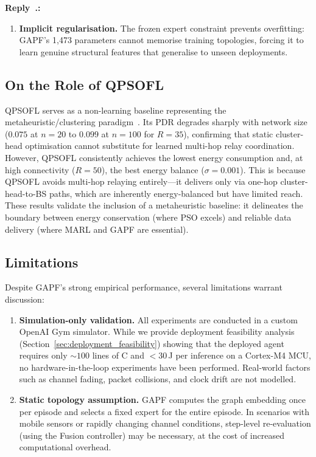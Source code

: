\documentclass[11pt]{article}
\newcounter{reviewer}
\newcounter{replyctr}[reviewer]
\renewcommand{\thereplyctr}{\thereviewer.\arabic{replyctr}}
\newenvironment{reply}
  {\refstepcounter{replyctr}%
   \addtocounter{replyctr}{-1}%
   \medskip\noindent
   \begin{sf}\textbf{Reply~\thereplyctr:}\ }
  {\addtocounter{replyctr}{1}%
   \medskip\end{sf}}
\begin{document}
\begin{refsection}
\begin{mdframed}[style=Resp]
\begin{reply}
\begin{enumerate}
    \item \textbf{Implicit regularisation.} The frozen expert constraint prevents overfitting: GAPF's 1{,}473 parameters cannot memorise training topologies, forcing it to learn genuine structural features that generalise to unseen deployments.
\end{enumerate}

\subsection{On the Role of QPSOFL}

QPSOFL serves as a non-learning baseline representing the metaheuristic/clustering paradigm~\cite{hu_energy_2024}. Its PDR degrades sharply with network size ($0.075$ at $n{=}20$ to $0.099$ at $n{=}100$ for $R{=}35$), confirming that static cluster-head optimisation cannot substitute for learned multi-hop relay coordination. However, QPSOFL consistently achieves the lowest energy consumption and, at high connectivity ($R{=}50$), the best energy balance ($\sigma = 0.001$). This is because QPSOFL avoids multi-hop relaying entirely---it delivers only via one-hop cluster-head-to-BS paths, which are inherently energy-balanced but have limited reach. These results validate the inclusion of a metaheuristic baseline: it delineates the boundary between energy conservation (where PSO excels) and reliable data delivery (where MARL and GAPF are essential).

\subsection{Limitations}
\label{sec:limitations}

Despite GAPF's strong empirical performance, several limitations warrant discussion:

\begin{enumerate}
    \item \textbf{Simulation-only validation.} All experiments are conducted in a custom OpenAI Gym simulator. While we provide deployment feasibility analysis (Section~\ref{sec:deployment_feasibility}) showing that the deployed agent requires only ${\sim}100$ lines of C and $<30$\,\textmu J per inference on a Cortex-M4 MCU, no hardware-in-the-loop experiments have been performed. Real-world factors such as channel fading, packet collisions, and clock drift are not modelled.
    
    \item \textbf{Static topology assumption.} GAPF computes the graph embedding once per episode and selects a fixed expert for the entire episode. In scenarios with mobile sensors or rapidly changing channel conditions, step-level re-evaluation (using the Fusion controller) may be necessary, at the cost of increased computational overhead.
    

\end{enumerate}
\end{reply}
\end{mdframed}
\end{refsection}
\end{document}
